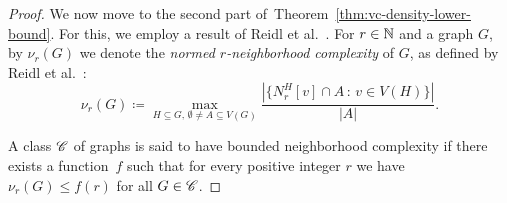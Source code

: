 \begin{proof}
\medskip We now move to the second part
of~Theorem~\ref{thm:vc-density-lower-bound}. For this, we employ a
result of Reidl et al.~\cite{reidl2016characterising}.
%
%
%
%
%
For $r\in \mathbb{N}$ and a graph $G$, by $\nu_r(G)$ we denote the
\emph{normed $r$-neighborhood complexity} of $G$, as defined by Reidl
et al.~\cite{reidl2016characterising}:
\begin{equation*}
  \nu_r(G)\coloneqq\max_{H\subseteq G,\,\emptyset\neq A\subseteq V(G)}\frac{|\{N_r^H[v]\cap A\, \colon\, v\in V(H)\}|}{|A|}.
\end{equation*}

A class $\mathscr{C}$ of graphs is said to have bounded neighborhood
complexity if there exists a function~$f$ such that for every positive
integer $r$ we have $\nu_r(G)\leq f(r)$ for all $G\in\mathscr{C}$.




\end{proof}
